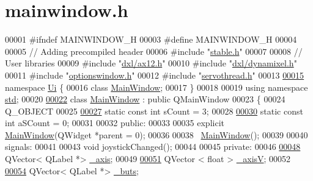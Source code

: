\hypertarget{a00016_source}{}\section{mainwindow.\+h}

\begin{DoxyCode}
00001 \textcolor{preprocessor}{#ifndef MAINWINDOW\_H}
00003 \textcolor{preprocessor}{#define MAINWINDOW\_H}
00004 
00005 \textcolor{comment}{// Adding precompiled header}
00006 \textcolor{preprocessor}{#include "\hyperlink{a00021}{stable.h}"}
00007 
00008 \textcolor{comment}{// User libraries}
00009 \textcolor{preprocessor}{#include "\hyperlink{a00009}{dxl/ax12.h}"}
00010 \textcolor{preprocessor}{#include "\hyperlink{a00013}{dxl/dynamixel.h}"}
00011 \textcolor{preprocessor}{#include "\hyperlink{a00018}{optionswindow.h}"}
00012 \textcolor{preprocessor}{#include "\hyperlink{a00020}{servothread.h}"}
00013 
\hypertarget{a00016_source_l00015}{}\hyperlink{a00023}{00015} \textcolor{keyword}{namespace }\hyperlink{a00023}{Ui} \{
00016 \textcolor{keyword}{class }\hyperlink{a00004}{MainWindow};
00017 \}
00018 
00019 \textcolor{keyword}{using namespace }\hyperlink{a00022}{std};
00020 
\hypertarget{a00016_source_l00022}{}\hyperlink{a00004}{00022} \textcolor{keyword}{class }\hyperlink{a00004}{MainWindow} : \textcolor{keyword}{public} QMainWindow
00023 \{
00024     Q\_OBJECT
00025     
\hypertarget{a00016_source_l00027}{}\hyperlink{a00004_a646727b1c45c72638325adfd460649c0}{00027}     \textcolor{keyword}{static} \textcolor{keyword}{const} \textcolor{keywordtype}{int} sCount = 3;
00028     
\hypertarget{a00016_source_l00030}{}\hyperlink{a00004_a42c44af9c0eebc33f4e81f02e15b0461}{00030}     \textcolor{keyword}{static} \textcolor{keyword}{const} \textcolor{keywordtype}{int} aSCount = 0;
00031     
00032 \textcolor{keyword}{public}:
00033     
00035     \textcolor{keyword}{explicit} \hyperlink{a00004}{MainWindow}(QWidget *parent = 0);
00036     
00038     ~\hyperlink{a00004}{MainWindow}();
00039     
00040 signals:
00041     
00043     \textcolor{keywordtype}{void} joystickChanged();
00044 
00045 \textcolor{keyword}{private}:  
00046     
\hypertarget{a00016_source_l00048}{}\hyperlink{a00004_a30c99d7a544f74b0650758e5cc7ead5a}{00048}     QVector< QLabel *> \hyperlink{a00004_a30c99d7a544f74b0650758e5cc7ead5a}{\_axis};
00049     
\hypertarget{a00016_source_l00051}{}\hyperlink{a00004_a20f66f574ed4c96d8dfc0013e1095f15}{00051}     QVector < float > \hyperlink{a00004_a20f66f574ed4c96d8dfc0013e1095f15}{\_axisV};
00052     
\hypertarget{a00016_source_l00054}{}\hyperlink{a00004_a8eaf474e1b8672f32873ed009e28ce8a}{00054}     QVector< QLabel *> \hyperlink{a00004_a8eaf474e1b8672f32873ed009e28ce8a}{\_buts};

\end{DoxyCode}
